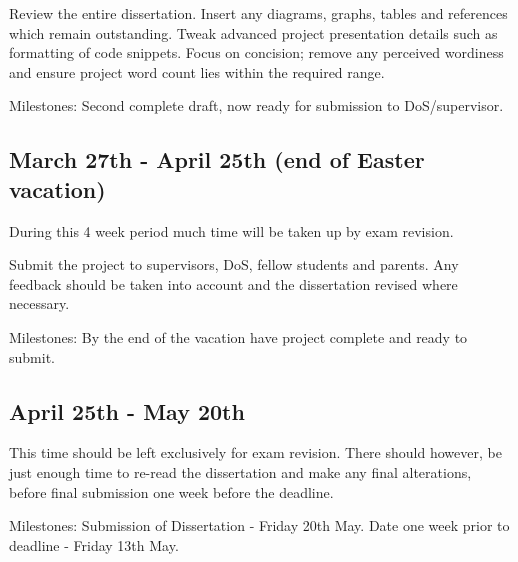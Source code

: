 \documentclass[12pt]{article}
\begin{document}
Review the entire dissertation. Insert any diagrams, graphs, tables and references which remain outstanding. Tweak advanced project presentation details such as formatting of code snippets. Focus on concision; remove any perceived wordiness and ensure project word count lies within the required range.

Milestones: Second complete draft, now ready for submission to DoS/supervisor.

\subsection*{March 27th - April 25th (end of Easter vacation)}

During this 4 week period much time will be taken up by exam revision.

Submit the project to supervisors, DoS, fellow students and parents. Any feedback should be taken into account and the dissertation revised where necessary.

Milestones: By the end of the vacation have project complete and ready to submit.


\subsection*{April 25th - May 20th}

This time should be left exclusively for exam revision. There should however, be just enough time to re-read the dissertation and make any final alterations, before final submission one week before the deadline.

Milestones: Submission of Dissertation - Friday 20th May. Date one week prior to deadline - Friday 13th May.
\end{document}
